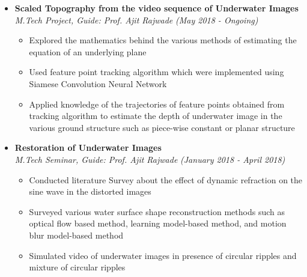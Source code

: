 \documentclass[a4paper,10pt]{article}
\newcommand{\isep}{-2 pt}
\begin{document}
\begin{itemize}
\item \textbf{Scaled Topography from the video sequence of Underwater Images}  \\
    \emph{M.Tech Project, Guide: Prof. Ajit Rajwade} \hfill {\emph{(May 2018 - Ongoing)}}
    \\[-0.6cm]
    \begin{itemize}
        \item Explored the mathematics behind the various methods of estimating the equation of an underlying plane
        \item Used feature point tracking algorithm which were implemented using Siamese Convolution Neural Network
        \item Applied knowledge of the trajectories of feature points obtained from tracking algorithm to estimate the depth of underwater  image in the various ground structure such as piece-wise constant or planar structure\\ [-0.6cm]
    \end{itemize}

\item \textbf{Restoration of Underwater Images} \\
    \emph{M.Tech Seminar, Guide:  Prof.  Ajit Rajwade}
    \hfill {\emph{(January 2018 - April 2018)}}
    \\ [-0.6cm]
      \begin{itemize}\itemsep \isep
        \item Conducted literature Survey  about the effect of dynamic refraction on the sine wave in the distorted images
        
        \vspace{0.07cm}
        
        \item Surveyed various water surface shape reconstruction methods such as optical flow based method, learning model-based method, and motion blur model-based method
        \vspace{0.07cm}
        
        \item Simulated video of underwater images in presence of circular ripples and mixture of circular ripples
    \\ [-0.5cm]
      \end{itemize}
\end{itemize}
\end{document}
